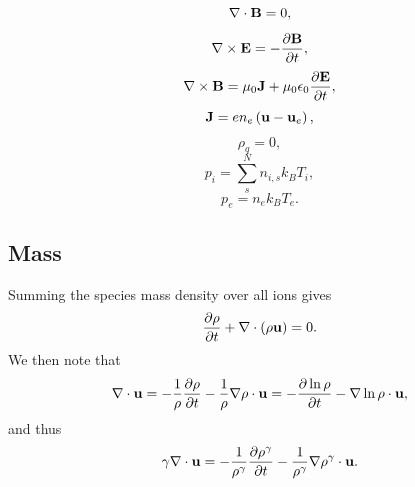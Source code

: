 \documentclass[a4paper,11pt]{report}
\begin{document}
\begin{equation}
    \label{eq:sf_sm_ms_maxwell_4}
    \nabla \cdot \mathbf{B} = 0,
\end{equation}
\begin{equation}
    \label{eq:sf_sm_ms_maxwell_1}
    \nabla \times \mathbf{E} = -\frac{ \partial \mathbf{B}}{\partial t},
\end{equation}
\begin{equation}
    \label{eq:sf_sm_ms_maxwell_2}
    \nabla \times \mathbf{B} = \mu_0 \mathbf{J} + \mu_0 \epsilon_0 \frac{\partial \mathbf{E}}{\partial t},
\end{equation}
\begin{equation}
    \label{eq:sf_sm_ms_curr_density}
    \mathbf{J} = e n_e \left( \mathbf{u} - \mathbf{u}_e \right),
\end{equation}
\begin{equation}
    \label{eq:sf_sm_ms_mass_density}
    \rho_q = 0,
\end{equation}
\begin{equation}
    \label{eq:sf_sm_ms_eos_ion}
    p_i = \sum_s^N n_{i,s} k_B T_i,
\end{equation}
\begin{equation}
    \label{eq:sf_sm_ms_eos_elec}
    p_e = n_e k_B T_e.
\end{equation}

\subsection{Mass}

Summing the species mass density over all ions gives
\begin{equation}
    \frac{\partial \rho}{\partial t} + \nabla \cdot \left( \rho \mathbf{u} \right) = 0.
\end{equation}
We then note that
\begin{equation*}
    \nabla \cdot \mathbf{u} = -\frac{1}{\rho} \frac{\partial \rho}{\partial t} - \frac{1}{\rho} \nabla \rho \cdot \mathbf{u} = - \frac{\partial \ln{\rho} }{\partial t} -  \nabla \ln{\rho} \cdot \mathbf{u},
\end{equation*}
and thus
\begin{equation}
    \label{eq:mhd_div_trick}
    \gamma \nabla \cdot \mathbf{u} = -\frac{1}{\rho^\gamma} \frac{\partial \rho^\gamma}{\partial t} - \frac{1}{\rho^\gamma} \nabla \rho^\gamma \cdot \mathbf{u}.
\end{equation}

\end{document}
